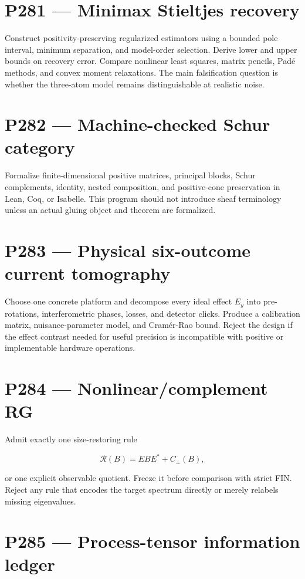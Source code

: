 \documentclass[11pt,a4paper,openany]{report}
\begin{document}
\section{P281 --- Minimax Stieltjes recovery}

Construct positivity-preserving regularized estimators using a bounded pole interval, minimum separation, and model-order selection. Derive lower and upper bounds on recovery error. Compare nonlinear least squares, matrix pencils, Padé methods, and convex moment relaxations. The main falsification question is whether the three-atom model remains distinguishable at realistic noise.

\section{P282 --- Machine-checked Schur category}

Formalize finite-dimensional positive matrices, principal blocks, Schur complements, identity, nested composition, and positive-cone preservation in Lean, Coq, or Isabelle. This program should not introduce sheaf terminology unless an actual gluing object and theorem are formalized.

\section{P283 --- Physical six-outcome current tomography}

Choose one concrete platform and decompose every ideal effect \(E_y\) into pre-rotations, interferometric phases, losses, and detector clicks. Produce a calibration matrix, nuisance-parameter model, and Cramér-Rao bound. Reject the design if the effect contrast needed for useful precision is incompatible with positive or implementable hardware operations.

\section{P284 --- Nonlinear/\allowbreak{}complement RG}

Admit exactly one size-restoring rule

\[
\mathcal R(B)=EBE^\ast+C_\perp(B),
\]

or one explicit observable quotient. Freeze it before comparison with strict FIN. Reject any rule that encodes the target spectrum directly or merely relabels missing eigenvalues.

\section{P285 --- Process-tensor information ledger}
\end{document}
